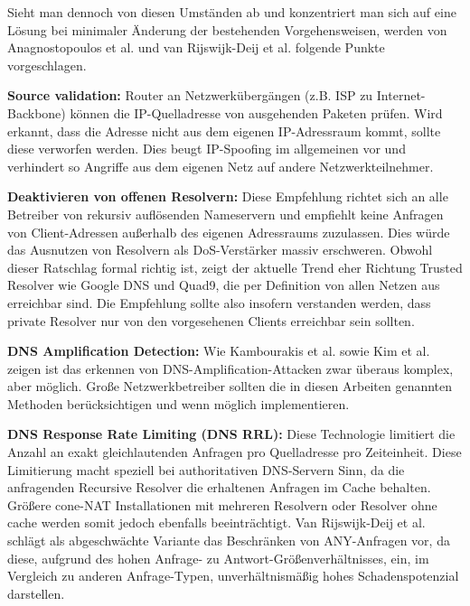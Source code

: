 Sieht man dennoch von diesen Umständen ab und konzentriert man sich auf eine Lösung bei minimaler Änderung der bestehenden Vorgehensweisen, werden von Anagnostopoulos et al.\cite{Anagnostopoulos2013} und van Rijswijk-Deij et al.\cite{VanRijswijk-Deij2014} folgende Punkte vorgeschlagen.

\textbf{Source validation:} Router an Netzwerkübergängen (z.B. ISP zu Internet-Backbone) können die IP-Quelladresse von ausgehenden Paketen prüfen. Wird erkannt, dass die Adresse nicht aus dem eigenen IP-Adressraum kommt, sollte diese verworfen werden. Dies beugt IP-Spoofing im allgemeinen vor und verhindert so Angriffe aus dem eigenen Netz auf andere Netzwerkteilnehmer.

\textbf{Deaktivieren von offenen Resolvern:} Diese Empfehlung richtet sich an alle Betreiber von rekursiv auflösenden Nameservern und empfiehlt keine Anfragen von Client-Adressen außerhalb des eigenen Adressraums zuzulassen. Dies würde das Ausnutzen von Resolvern als DoS-Verstärker massiv erschweren. Obwohl dieser Ratschlag formal richtig ist, zeigt der aktuelle Trend eher Richtung Trusted Resolver wie Google DNS und Quad9, die per Definition von allen Netzen aus erreichbar sind. Die Empfehlung sollte also insofern verstanden werden, dass private Resolver nur von den vorgesehenen Clients erreichbar sein sollten.

\textbf{DNS Amplification Detection:} Wie Kambourakis et al.\cite{Kambourakis2008} sowie Kim et al.\cite{Kim2011} zeigen ist das erkennen von DNS-Amplification-Attacken zwar überaus komplex, aber möglich. Große Netzwerkbetreiber sollten die in diesen Arbeiten genannten Methoden berücksichtigen und wenn möglich implementieren.

\textbf{DNS Response Rate Limiting (DNS RRL):} Diese Technologie limitiert die Anzahl an exakt gleichlautenden Anfragen pro Quelladresse pro Zeiteinheit. Diese Limitierung macht speziell bei authoritativen DNS-Servern Sinn, da die anfragenden Recursive Resolver die erhaltenen Anfragen im Cache behalten. Größere cone-NAT Installationen mit mehreren Resolvern oder Resolver ohne cache werden somit jedoch ebenfalls beeinträchtigt. Van Rijswijk-Deij et al.\cite{VanRijswijk-Deij2014} schlägt als abgeschwächte Variante das Beschränken von ANY-Anfragen vor, da diese, aufgrund des hohen Anfrage- zu Antwort-Größenverhältnisses, ein, im Vergleich zu anderen Anfrage-Typen, unverhältnismäßig hohes Schadenspotenzial darstellen.